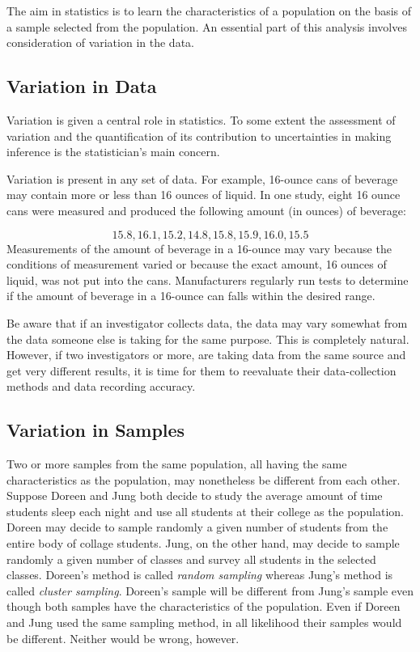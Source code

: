 \documentclass[]{krantz}
\theoremstyle{definition}
\theoremstyle{definition}
\theoremstyle{definition}
\theoremstyle{remark}
\begin{document}
The aim in statistics is to learn the characteristics of a population on
the basis of a sample selected from the population. An essential part of
this analysis involves consideration of variation in the data.

\subsection{Variation in Data}\label{variation-in-data}

Variation is given a central role in statistics. To some extent the
assessment of variation and the quantification of its contribution to
uncertainties in making inference is the statistician's main concern.

Variation is present in any set of data. For example, 16-ounce cans of
beverage may contain more or less than 16 ounces of liquid. In one
study, eight 16 ounce cans were measured and produced the following
amount (in ounces) of beverage:

\[15.8,16.1,15.2,14.8,15.8,15.9,16.0,15.5\] Measurements of the amount
of beverage in a 16-ounce may vary because the conditions of measurement
varied or because the exact amount, 16 ounces of liquid, was not put
into the cans. Manufacturers regularly run tests to determine if the
amount of beverage in a 16-ounce can falls within the desired range.

Be aware that if an investigator collects data, the data may vary
somewhat from the data someone else is taking for the same purpose. This
is completely natural. However, if two investigators or more, are taking
data from the same source and get very different results, it is time for
them to reevaluate their data-collection methods and data recording
accuracy.

\subsection{Variation in Samples}\label{variation-in-samples}

Two or more samples from the same population, all having the same
characteristics as the population, may nonetheless be different from
each other. Suppose Doreen and Jung both decide to study the average
amount of time students sleep each night and use all students at their
college as the population. Doreen may decide to sample randomly a given
number of students from the entire body of collage students. Jung, on
the other hand, may decide to sample randomly a given number of classes
and survey all students in the selected classes. Doreen's method is
called \emph{random sampling} whereas Jung's method is called
\emph{cluster sampling}. Doreen's sample will be different from Jung's
sample even though both samples have the characteristics of the
population. Even if Doreen and Jung used the same sampling method, in
all likelihood their samples would be different. Neither would be wrong,
however.
\end{document}
